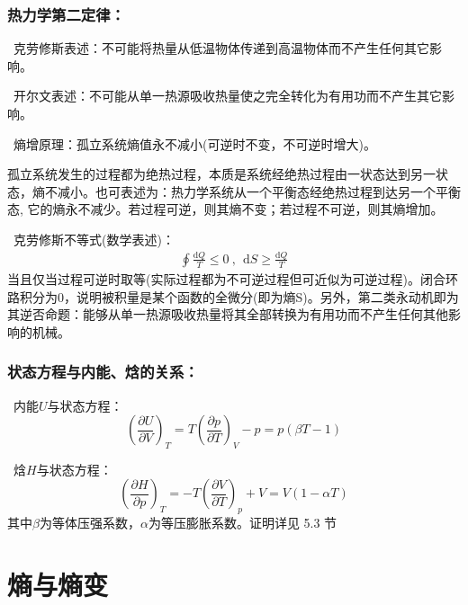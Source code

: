\documentclass[zihao=-4,UTF8]{report}
\begin{document}
\subsubsection{热力学第二定律：}
\ 克劳修斯表述：不可能将热量从低温物体传递到高温物体而不产生任何其它影响。\par
{}\ 开尔文表述：不可能从单一热源吸收热量使之完全转化为有用功而不产生其它影响。\par
{}\ 熵增原理：孤立系统熵值永不减小(可逆时不变，不可逆时增大)。\par
{\par\color{gray}\small
孤立系统发生的过程都为绝热过程，本质是系统经绝热过程由一状态达到另一状态，熵不减小。也可表述为：热力学系统从一个平衡态经绝热过程到达另一个平衡态, 它的熵永不减少。若过程可逆，则其熵不变；若过程不可逆，则其熵增加。
\par}

\ 克劳修斯不等式(数学表述)：
\begin{gather}
    \oint \frac{\mathrm{d}Q}{\, T\, } \le 0\ ,\ \ 
    \mathrm{d}S \ge \frac{\mathrm{d}Q}{T}
\end{gather}
{\color{gray}\small 当且仅当过程可逆时取等(实际过程都为不可逆过程但可近似为可逆过程)。闭合环路积分为0，说明被积量是某个函数的全微分(即为熵S)。另外，第二类永动机即为其逆否命题：能够从单一热源吸收热量将其全部转换为有用功而不产生任何其他影响的机械。}

\subsubsection{状态方程与内能、焓的关系：}
\ 内能$U$与状态方程：
\begin{equation}
    \left(\frac{\partial U}{\partial V} \right)_T = T \left(\frac{\partial p}{\partial T}\right)_V - p =p\left(\beta T -1\right)
\end{equation}
\par
{}\ 焓$H$与状态方程：
\begin{equation}
    \left(\frac{\partial H}{\partial p} \right)_T = -T \left(\frac{\partial V}{\partial T}\right)_p + V = V\left( 1- \alpha T\right)
\end{equation}
{\color{gray}\small 其中$\beta$为等体压强系数，$\alpha $为等压膨胀系数。证明详见 5.3 节}
\section{熵与熵变}
\end{document}
